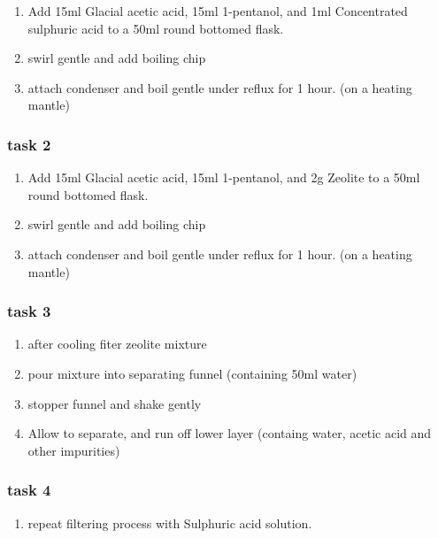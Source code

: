 \documentclass[]{article}
\providecommand{\tightlist}{%
  \setlength{\itemsep}{0pt}\setlength{\parskip}{0pt}}
\begin{document}
\begin{enumerate}
\def\labelenumi{\arabic{enumi}.}
\tightlist
\item
  Add 15ml Glacial acetic acid, 15ml 1-pentanol, and 1ml Concentrated
  sulphuric acid to a 50ml round bottomed flask.
\item
  swirl gentle and add boiling chip
\item
  attach condenser and boil gentle under reflux for 1 hour. (on a
  heating mantle)
\end{enumerate}

\hypertarget{task-2}{%
\subsubsection{task 2}\label{task-2}}

\begin{enumerate}
\def\labelenumi{\arabic{enumi}.}
\tightlist
\item
  Add 15ml Glacial acetic acid, 15ml 1-pentanol, and 2g Zeolite to a
  50ml round bottomed flask.\\
\item
  swirl gentle and add boiling chip
\item
  attach condenser and boil gentle under reflux for 1 hour. (on a
  heating mantle)
\end{enumerate}

\hypertarget{task-3}{%
\subsubsection{task 3}\label{task-3}}

\begin{enumerate}
\def\labelenumi{\arabic{enumi}.}
\tightlist
\item
  after cooling fiter zeolite mixture
\item
  pour mixture into separating funnel (containing 50ml water)
\item
  stopper funnel and shake gently
\item
  Allow to separate, and run off lower layer (containg water, acetic
  acid and other impurities)
\end{enumerate}

\hypertarget{task-4}{%
\subsubsection{task 4}\label{task-4}}

\begin{enumerate}
\def\labelenumi{\arabic{enumi}.}
\setcounter{enumi}{4}
\tightlist
\item
  repeat filtering process with Sulphuric acid solution.
\end{enumerate}
\end{document}
